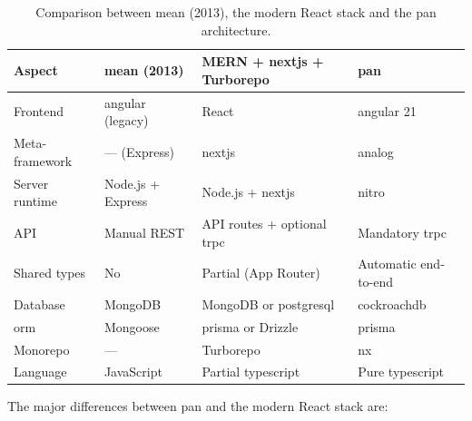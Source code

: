 \begin{table}[htbp]
\centering
\caption{Comparison between \gls{mean} (2013), the modern React stack and the \gls{pan} architecture.}
\label{tab:pan-vs-altele}
\small
\begin{tabularx}{\textwidth}{lYYY}
\toprule
\textbf{Aspect} & \textbf{\gls{mean} (2013)} & \textbf{MERN + \gls{nextjs} + Turborepo} & \textbf{\gls{pan}} \\
\midrule
Frontend         & \gls{angular} (legacy)  & React                  & \gls{angular} 21 \\
Meta-framework   & --- (Express)           & \gls{nextjs}           & \gls{analog} \\
Server runtime   & Node.js + Express       & Node.js + \gls{nextjs} & \gls{nitro} \\
API              & Manual REST             & API routes + optional \gls{trpc} & Mandatory \gls{trpc} \\
Shared types     & No                      & Partial (App Router)   & Automatic end-to-end \\
Database         & MongoDB                 & MongoDB or \gls{postgresql} & \gls{cockroachdb} \\
\gls{orm}        & Mongoose                & \gls{prisma} or Drizzle & \gls{prisma} \\
Monorepo         & ---                     & Turborepo              & \gls{nx} \\
Language         & JavaScript              & Partial \gls{typescript} & Pure \gls{typescript} \\
\bottomrule
\end{tabularx}
\end{table}

The major differences between \gls{pan} and the modern React stack are:

